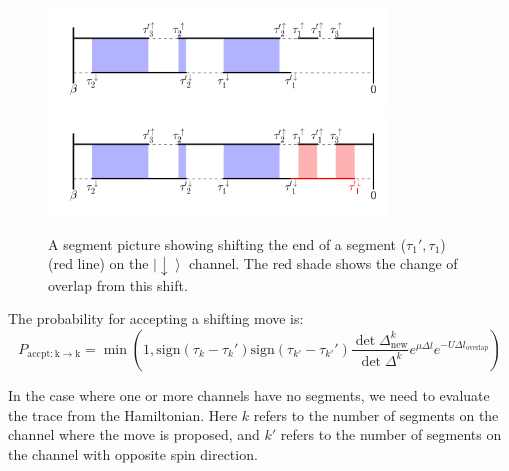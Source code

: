\begin{figure}[ht]
  \centering
  \includegraphics[width=0.8\textwidth] {img/segment.png}
  \includegraphics[width=0.8\textwidth] {img/segment_shift.png}
  \caption{A segment picture showing shifting the end of a segment ($\tau_1',\tau_1$)
(red line) on the $\left|\downarrow\right\rangle$ channel. The red shade shows the
change of overlap from this shift.
}

\label{fig:seg_shift}
\end{figure}

The probability for accepting a shifting move is:
\begin{equation}
P_\mathrm{accpt:k\rightarrow k}=\min\left(1,
  \mathrm{sign}(\tau_k-\tau_k')\mathrm{sign}(\tau_{k'}-\tau_{k'}')
  \frac{\det\Delta^{k}_{\mathrm{new}}}{\det\Delta^{k}}
  e^{\mu\Delta l}e^{-U \Delta l_\mathrm{overlap}}
\right)
\end{equation}

In the case where one or more channels have no segments, we need to evaluate the trace
from the Hamiltonian. Here $k$ refers to the number of segments on the channel
where the move is proposed, and $k'$ refers to the number of segments on the
channel with opposite spin direction.

